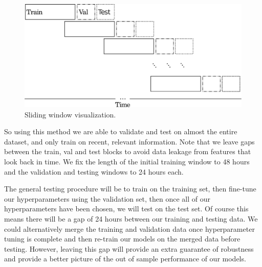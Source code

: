 \begin{figure}[htpb]
    \centering
    \includegraphics[width=1.0\textwidth]{./images/sliding_window.pdf}
    \caption{Sliding window visualization.}
    \label{fig:slidingwindow}
\end{figure}

So using this method we are able to validate and test on almost the entire dataset,
and only train on recent, relevant information. Note that we leave gaps between the train,
val and test blocks to avoid data leakage from features that look back in time.
We fix the length of the initial training window to 48 hours and the validation and testing windows to 24 hours each.

The general testing procedure will be to train on the training set, then fine-tune our hyperparameters using
the validation set, then once all of our hyperparameters have been chosen, 
we will test on the test set. Of course this means there will be a gap of 24 hours between our training
and testing data. We could alternatively merge the training and validation data once hyperparameter tuning is
complete and then re-train our models on the merged data before testing. However, leaving this gap
will provide an extra guarantee of robustness and provide a better picture of the out of sample
performance of our models.


